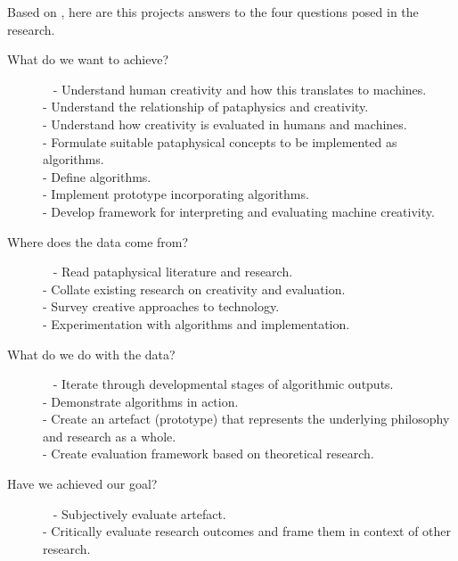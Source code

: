 \spirals

Based on \autocite{Holz2006}, here are this projects answers to the four questions posed in the research.

\begin{description}
  \item[What do we want to achieve?]~
    - Understand human creativity and how this translates to machines.\\
    - Understand the relationship of pataphysics and creativity.\\
    - Understand how creativity is evaluated in humans and machines.\\
    - Formulate suitable pataphysical concepts to be implemented as algorithms.\\ 
    - Define algorithms.\\
    - Implement prototype incorporating algorithms.\\
    - Develop framework for interpreting and evaluating machine creativity.
	\item[Where does the data come from?]~
    - Read pataphysical literature and research.\\
    - Collate existing research on creativity and evaluation.\\
    - Survey creative approaches to technology.\\
    - Experimentation with algorithms and implementation.\\
	\item[What do we do with the data?]~
    - Iterate through developmental stages of algorithmic outputs.\\
    - Demonstrate algorithms in action.\\
    - Create an artefact (prototype) that represents the underlying philosophy and research as a whole.\\
    - Create evaluation framework based on theoretical research.
  \item[Have we achieved our goal?]~
    - Subjectively evaluate artefact.\\
    - Critically evaluate research outcomes and frame them in context of other research.
\end{description}

